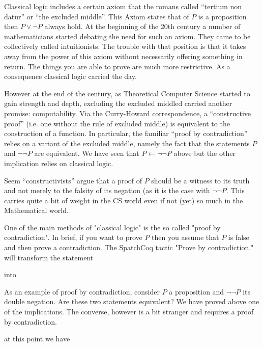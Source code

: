 Classical logic includes a certain axiom that the romans called ``tertium non datur'' or ``the excluded middle''. This Axiom states that of $P$ is a proposition then $P\lor \neg P$ always hold. At the beginning of the 20th century a number of mathematicians started debating the need for such an axiom. They came to be collectively called intuitionists. The trouble with that position is that it takes away from the power of this axiom without necessarily offering something in return. The things you are able to prove are much more restrictive. As a consequence classical logic carried the day.

However at the end of the century, as Theoretical Computer Science started to gain strength and depth, excluding the excluded middled carried another promise: computability. Via the Curry-Howard correspondence, a ``constructive proof'' (i.e. one without the rule of excluded middle) is equivalent to the construction of a function. In particular, the familiar ``proof by contradiction'' relies on a variant of the excluded middle, namely the fact that the statements $P$ and $\neg \neg P$ are equivalent. We have seen that $P \leftarrow \neg \neg P$ above but the other implication relies on classical logic.

Seem ``constructivists'' argue that a proof of $P$ should be a witness to its truth and not merely to the falsity of its negation (as it is the case with $\neg \neg P$. This carries quite a bit of weight in the CS world even if not (yet) so much in the Mathematical world.

One of the main methods of "classical logic" is the so called "proof by contradiction". In brief, if you want to prove $P$ then you assume that $P$ is false and then prove a contradiction. The SpatchCoq tactic 
"Prove by contradiction." will transform the statement


into 


As an example of proof by contradiction, consider $P$ a proposition and $\neg \neg P$ its double negation. Are these two statements equivalent? We have proved above one of the implications. The converse, however is a bit stranger and requires a proof by contradiction.



at this point we have 

